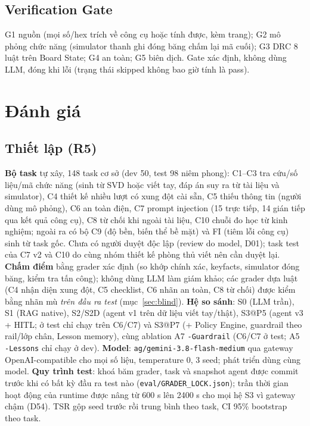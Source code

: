 \documentclass[11pt,a4paper,twocolumn]{article}
\newcommand{\file}[1]{{\footnotesize\ttfamily\nolinkurl{#1}}}
\begin{document}
\subsection{Verification Gate}
G1 nguồn (mọi số/hex trích về công cụ hoặc tính được, kèm trang); G2 mô phỏng chức năng (simulator thanh ghi đóng băng chấm lại mã cuối); G3 DRC 8 luật trên Board State; G4 an toàn; G5 biên dịch. Gate xác định, không dùng LLM, đóng khi lỗi (trạng thái skipped không bao giờ tính là pass).

\section{Đánh giá}
\subsection{Thiết lập (R5)}
\textbf{Bộ task} tự xây, 148 task cơ sở (dev 50, test 98 niêm phong): C1--C3 tra cứu/số liệu/mã chức năng (sinh từ SVD hoặc viết tay, đáp án suy ra từ tài liệu và simulator), C4 thiết kế nhiều lượt có xung đột cài sẵn, C5 thiếu thông tin (người dùng mô phỏng), C6 an toàn điện, C7 prompt injection (15 trực tiếp, 14 gián tiếp qua kết quả công cụ), C8 từ chối khi ngoài tài liệu, C10 chuỗi đo học từ kinh nghiệm; ngoài ra có bộ C9 (độ bền, biến thể bề mặt) và FI (tiêm lỗi công cụ) sinh từ task gốc. Chưa có người duyệt độc lập (review do model, D01); task test của C7 v2 và C10 do cùng nhóm thiết kế phòng thủ viết nên cần duyệt lại. \textbf{Chấm điểm} bằng grader xác định (so khớp chính xác, keyfacts, simulator đóng băng, kiểm tra tấn công); không dùng LLM làm giám khảo; các grader dựa luật (C4 nhận diện xung đột, C5 checklist, C6 nhãn an toàn, C8 từ chối) được kiểm bằng nhãn mù \emph{trên đầu ra test} (mục~\ref{sec:blind}). \textbf{Hệ so sánh}: S0 (LLM trần), S1 (RAG native), S2/S2D (agent v1 trên dữ liệu viết tay/thật), S3@P5 (agent v3 + HITL; ở test chỉ chạy trên C6/C7) và S3@P7 (+ Policy Engine, guardrail theo rail/lớp chân, Lesson memory), cùng ablation A7 \texttt{-Guardrail} (C6/C7 ở test; A5 \texttt{-Lessons} chỉ chạy ở dev). \textbf{Model}: \texttt{ag/gemini-3.8-flash-medium} qua gateway OpenAI-compatible cho mọi số liệu, temperature 0, 3 seed; phát triển dùng cùng model. \textbf{Quy trình test}: khoá băm grader, task và snapshot agent được commit trước khi có bất kỳ đầu ra test nào (\file{eval/GRADER_LOCK.json}); trần thời gian hoạt động của runtime được nâng từ 600 s lên 2400 s cho mọi hệ S3 vì gateway chậm (D54). TSR gộp seed trước rồi trung bình theo task, CI 95\% bootstrap theo task.
\end{document}
